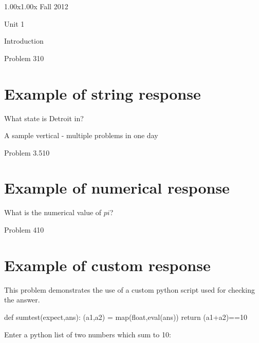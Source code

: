 \documentclass[12pt]{article}
\begin{document}
\begin{edXcourse}{1.00x}{1.00x Fall 2012}
\begin{edXchapter}{Unit 1}
\begin{edXsection}{Introduction}
\begin{edXproblem}{Problem 3}{10}
\section{Example of string response}  

What state is Detroit in?


\end{edXproblem}


\begin{edXvertical}{A sample vertical - multiple problems in one day}


\begin{edXproblem}{Problem 3.5}{10}

\section{Example of numerical response}  

What is the numerical value of $pi$?


\end{edXproblem}


\begin{edXproblem}{Problem 4}{10}

\section{Example of custom response}  

This problem demonstrates the use of a custom python script used for
checking the answer.

\begin{edXscript}
def sumtest(expect,ans):
    (a1,a2) = map(float,eval(ans))
    return (a1+a2)==10
\end{edXscript}

Enter a python list of two numbers which sum to 10:


\end{edXproblem}



\end{edXvertical}
\end{edXsection}
\end{edXchapter}
\end{edXcourse}
\end{document}
